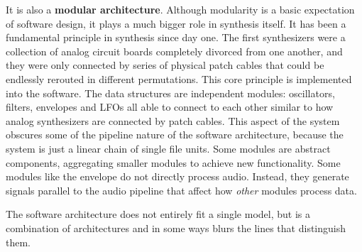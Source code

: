 \documentclass[acmlarge,screen]{acmart}
\begin{document}
	It is also a \textbf{modular architecture}. Although modularity is a basic expectation of software design, it plays a much bigger role in synthesis itself. It has been a fundamental principle in synthesis since day one. The first synthesizers were a collection of analog circuit boards completely divorced from one another, and they were only connected by series of physical patch cables that could be endlessly rerouted in different permutations. This core principle is implemented into the software. The data structures are independent modules: oscillators, filters, envelopes and LFOs all able to connect to each other similar to how analog synthesizers are connected by patch cables. This aspect of the system obscures some of the pipeline nature of the software architecture, because the system is just a linear chain of single file units. Some modules are abstract components, aggregating smaller modules to achieve new functionality. Some modules like the envelope do not directly process audio. Instead, they generate signals parallel to the audio pipeline that affect how \textit{other} modules process data. 
	
	The software architecture does not entirely fit a single model, but is a combination of architectures and in some ways blurs the lines that distinguish them.
\end{document}
